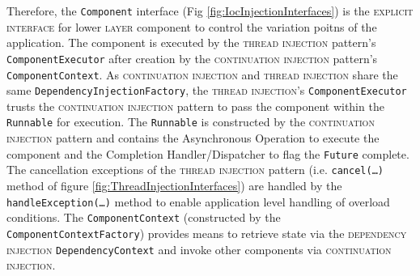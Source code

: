 \documentclass[prodmode]{style/acmlarge}
\begin{document}
Therefore, the \texttt{Component} interface (Fig
\ref{fig:IocInjectionInterfaces}) is the \textsc{explicit interface} for lower \textsc{layer}
component to control the variation poitns of the application.  The component is
executed by the \textsc{thread injection} pattern's
\texttt{ComponentExecutor} after creation by the \textsc{continuation injection}
pattern's \texttt{ComponentContext}.  As \textsc{continuation injection} and
\textsc{thread injection} share the same \texttt{DependencyInjectionFactory},
the \textsc{thread injection}'s \texttt{ComponentExecutor} trusts the
\textsc{continuation injection} pattern to pass the component within the
\texttt{Runnable} for execution.  The \texttt{Runnable} is constructed by the
\textsc{continuation injection} pattern and contains the Asynchronous Operation
to execute the component and the Completion Handler/Dispatcher to flag the
\texttt{Future} complete.  The cancellation exceptions of the \textsc{thread
injection} pattern (i.e. \texttt{cancel(\ldots)} method of figure
\ref{fig:ThreadInjectionInterfaces}) are handled by the
\texttt{handleException(\ldots)} method to enable application level handling of
overload conditions.  The \texttt{ComponentContext} (constructed by the
\texttt{ComponentContextFactory}) provides means to retrieve state via the
\textsc{dependency injection} \texttt{Dependency\-Context} and invoke other
components via \textsc{continuation injection}.
\end{document}
